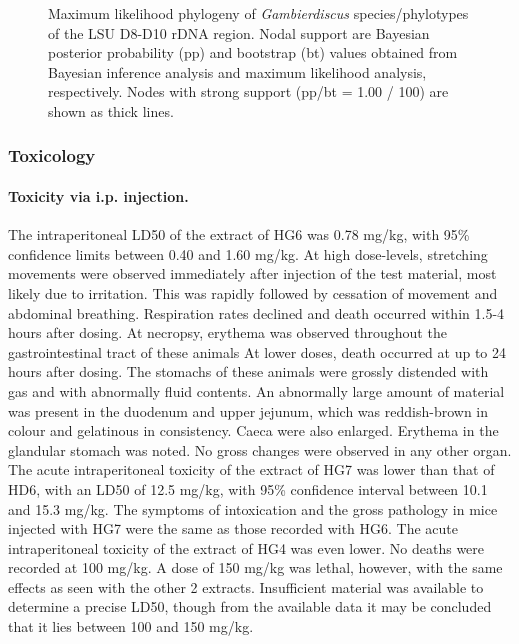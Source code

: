 \documentclass[12pt]{article}
\begin{document}
\begin{figure} 
\caption{Maximum likelihood phylogeny of \textit{Gambierdiscus} species/phylotypes of the LSU D8-D10 rDNA region. Nodal support are Bayesian posterior probability (pp) and bootstrap (bt) values obtained from Bayesian inference analysis and maximum likelihood analysis, respectively. Nodes with strong support (pp/bt = 1.00 / 100) are shown as thick lines.} 
\label{fig:HGD8D10}
\end{figure} 
\FloatBarrier 


\subsubsection{Toxicology}

\paragraph{Toxicity via i.p. injection.}
The intraperitoneal LD50 of the extract of HG6 was 0.78 mg/kg, with 95\% confidence limits between 0.40 and 1.60 mg/kg. At high dose-levels, stretching movements were observed immediately after injection of the test material, most likely due to irritation. This was rapidly followed by cessation of movement and abdominal breathing. Respiration rates declined and death occurred within 1.5-4 hours after dosing. At necropsy, erythema was observed throughout the gastrointestinal tract of these animals At lower doses, death occurred at up to 24 hours after dosing. The stomachs of these animals were grossly distended with gas and with abnormally fluid contents. An abnormally large amount of material was present in the duodenum and upper jejunum, which was reddish-brown in colour and gelatinous in consistency. Caeca were also enlarged. Erythema in the glandular stomach was noted. No gross changes were observed in any other organ. 
The acute intraperitoneal toxicity of the extract of HG7 was lower than that of HD6, with an LD50 of 12.5 mg/kg, with 95\% confidence interval between 10.1 and 15.3 mg/kg. The symptoms of intoxication and the gross pathology in mice injected with HG7 were the same as those recorded with HG6. 
The acute intraperitoneal toxicity of the extract of HG4 was even lower. No deaths were recorded at 100 mg/kg. A dose of 150 mg/kg was lethal, however, with the same effects as seen with the other 2 extracts. Insufficient material was available to determine a precise LD50, though from the available data it may be concluded that it lies between 100 and 150 mg/kg.
\end{document}
